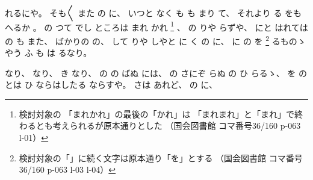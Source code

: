 れるにや。
%
そも〳〵
また
の
に、
%
いつと
なく
も%
も%
まり
て、
%
それより
る
をも
へるか
。
%
%
の
つて
でし
ところは
まれ
かれ
\footnote{%
検討対象の
「まれかれ」の最後の「かれ」は
「まれまれ」と「まれ」で終わるとも考えられるが原本通りとした
（国会図書館 コマ番号36/160 p-063 l-01）}%
、
%
の
りや
らずや、
%
にと
はれては
の
も
また、
%
ばかりの
の、
%
して
りや
しやと
に
く
の
に、
%
に
の
を
\footnote{%
検討対象の「」に続く文字は原本通り「を」とする
（国会図書館 コマ番号36/160 p-063 l-03 l-04）
}%
るものゝやう%
ふ
も%
は
るなり。

%
なり、
%
なり、
%
き
なり、
%
の
の
ばぬ
には、
%
の
さにぞ
らぬ
の
ひ
らるゝ、%
%
を
の
とは
ひ
ならはしたる
ならすや。
%
さは
あれど、
%
の
に、


